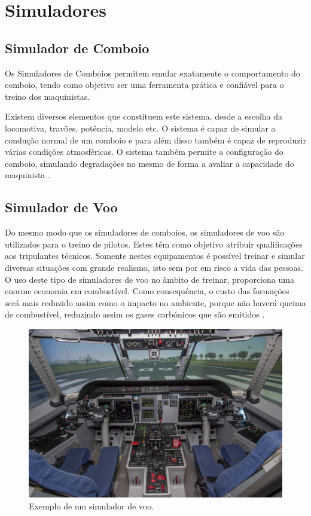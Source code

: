 \section{Simuladores}
\subsection{Simulador de Comboio}

Os Simuladores de Comboios permitem emular exatamente o comportamento do comboio, tendo como objetivo ser uma ferramenta prática e confiável para o treino dos maquinistas.

Existem diversos elementos que constituem este sistema, desde a escolha da locomotiva, travões, potência, modelo etc. O sistema é capaz de simular a condução normal de um comboio e para além disso também é capaz de reproduzir várias condições atmosféricas. O sistema também permite a configuração do comboio, simulando degradações no mesmo de forma a avaliar a capacidade do maquinista \cite{RV_comboio}.


\subsection{Simulador de Voo}

Do mesmo modo que os simuladores de comboios, os simuladores de voo são utilizados para o treino de pilotos. Estes têm como objetivo atribuir qualificações aos tripulantes técnicos. Somente nestes equipamentos é possível treinar e simular diversas situações com grande realismo, isto sem por em risco a vida das pessoas.
O uso deste tipo de simuladores de voo no âmbito de treinar, proporciona uma enorme economia em combustível. Como consequência, o custo das formações será mais reduzido assim como o impacto no ambiente, porque não haverá queima de combustível, reduzindo assim os gases carbónicos que são emitidos \cite{RV_aviao}.

\begin{figure}[h]
\center
\includegraphics[scale=0.2]{imagens/RV_simulador_voo.jpg}
\caption{Exemplo de um simulador de voo. \cite{RV_sim_voo}}
\end{figure}

